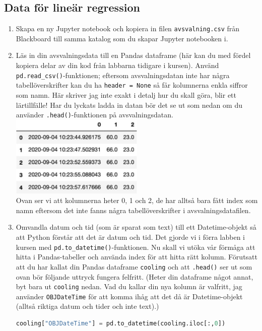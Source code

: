 \documentclass{article}
\begin{document}
\subsection{Data för lineär regression}
\begin{enumerate}
    \item Skapa en ny Jupyter notebook och kopiera in filen \texttt{avsvalning.csv} från Blackboard till samma katalog som du skapar Jupyter notebooken i. 
    \item Läs in din avsvalningsdata till en Pandas dataframe (här kan du med fördel kopiera delar av din kod från labbarna  tidigare i kursen). Använd \texttt{pd.read\_csv()}-funktionen; eftersom avsvalningsdatan inte har några tabellöverskrifter kan du ha \texttt{header = None} så får kolumnerna enkla siffror som namn. Här skriver jag inte exakt i detalj hur du skall göra, blir ett lärtillfälle! Har du lyckats ladda in datan bör det se ut som nedan om du använder \texttt{.head()}-funktionen på avsvalningsdatan.\\
    \includegraphics[width=0.5\textwidth]{figures/pandas1.png}\\
    Ovan ser vi att kolumnerna heter 0, 1 och 2, de har alltså bara fått index som namn eftersom det inte fanns några tabellöverskrifter i avsvalningsdatafilen.
    \item Omvandla datum och tid (som är sparat som text) till ett Datetime-objekt så att Python förstår att det är datum och tid. Det gjorde vi i förra labben i kursen med \texttt{pd.to\_datetime()}-funktionen. Nu skall vi utöka vår förmåga att hitta i Pandas-tabeller och använda index för att hitta rätt kolumn. Förutsatt att du har kallat din Pandas dataframe \texttt{cooling} och att \texttt{.head()} ser ut som ovan bör följande uttryck fungera felfritt. 
    (Heter din dataframe något annat, byt bara ut \texttt{cooling} nedan. Vad du kallar din nya kolumn är valfritt, jag använder \texttt{OBJDateTime} för att komma ihåg att det då är Datetime-objekt (alltså riktiga datum och tider och inte text).)    
\begin{lstlisting}[language=Python]
cooling["OBJDateTime"] = pd.to_datetime(cooling.iloc[:,0])\end{lstlisting}

\end{enumerate}
\end{document}
